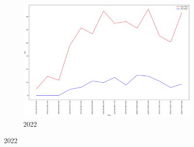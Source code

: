 \begin{figure}[h]
\begin{subfigure}{0.45\textwidth}
		\centering
		\includegraphics[width=\textwidth]{graphs/2022/FWIX_maxMin.png}
		\caption{2022}
	\end{subfigure}
	
	\label{fig:daily_fwix_maxmin}
\end{figure}

